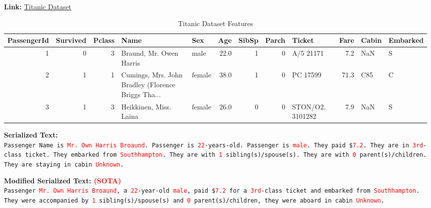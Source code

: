 \documentclass{article}
\theoremstyle{plain}
\theoremstyle{definition}
\theoremstyle{remark}
\begin{document}
\textbf{Link: }\href{https://www.openml.org/search?type=data&sort=runs&id=40945&status=active}{Titanic Dataset} 

\begin{table}[h!]
    \centering
    \caption{Titanic Dataset Features}
\begin{adjustbox}{width=\textwidth}
\begin{tabular}{rrrllrrrlrll}
\toprule
 PassengerId &  Survived &  Pclass &                                               Name &    Sex &  Age &  SibSp &  Parch &           Ticket &  Fare & Cabin & Embarked \\
\midrule
           1 &         0 &       3 &                            Braund, Mr. Owen Harris &   male & 22.0 &      1 &      0 &        A/5 21171 &   7.2 &   NaN &        S \\
           2 &         1 &       1 & Cumings, Mrs. John Bradley (Florence Briggs Tha... & female & 38.0 &      1 &      0 &         PC 17599 &  71.3 &   C85 &        C \\
           3 &         1 &       3 &                             Heikkinen, Miss. Laina & female & 26.0 &      0 &      0 & STON/O2. 3101282 &   7.9 &   NaN &        S \\
\bottomrule
\end{tabular}
\end{adjustbox}
\end{table}

\begin{mdframed}
\textbf{Serialized Text:}\\
\texttt{Passenger Name is \textcolor{red}{Mr. Own Harris Broaund}. Passenger is \textcolor{red}{22}-years-old. Passenger is \textcolor{red}{male}. They paid \$\textcolor{red}{7.2}. They are in \textcolor{red}{3rd}-class ticket. They embarked from \textcolor{red}{Southhampton}. They are with \textcolor{red}{1} sibling(s)/spouse(s). They are with \textcolor{red}{0} parent(s)/children. They are staying in cabin \textcolor{red}{Unknown}.
}
\end{mdframed}

\begin{mdframed}
\textbf{Modified Serialized Text: \textcolor{red}{(SOTA)}}\\
\texttt{Passenger \textcolor{red}{Mr. Own Harris Broaund}, a \textcolor{red}{22}-year-old \textcolor{red}{male}, paid \$\textcolor{red}{7.2} for a \textcolor{red}{3rd}-class ticket and embarked from \textcolor{red}{Southhampton}. They were accompanied by \textcolor{red}{1} sibling(s)/spouse(s) and \textcolor{red}{0} parent(s)/children, they were aboard in cabin \textcolor{red}{Unknown}.
}
\end{mdframed}
\end{document}
